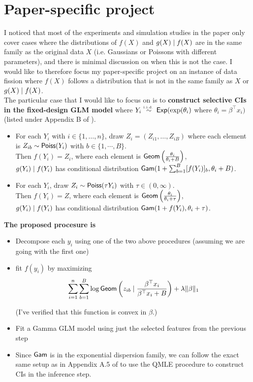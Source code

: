 \section{Paper-specific project}
I noticed that most of the experiments and simulation studies in the paper only cover cases where the distributions of $f(X)$ and $g(X)\mid f(X)$ are in the same family as the original data $X$ (i.e. Gaussians or Poissons with different parameters), and there is minimal discussion on when this is not the case. I would like to therefore focus my paper-specific project on an instance of data fission where $f(X)$ follows a distribution that is not in the same family as $X$ or $g(X)\mid f(X)$.\\

The particular case that I would like to focus on is to \textbf{construct selective CIs in the fixed-design GLM model} where $Y_i \overset{\textrm{\tiny i.i.d.\ }}{\sim} {\sf{Exp}}(\exp(\theta_i)$ where $\theta_i=\beta^\top x_i)$ (listed under Appendix B of \cite{leiner2022data}).

\begin{itemize}
\item For each $Y_i$ with $i\in\{1,\dots,n\}$, draw $Z_i=(Z_{i1}, \dots, Z_{iB})$ where each element is \iid $Z_{ib} \sim {\sf{Poiss}}(Y_i)$ with $b\in\{1,\cdots,B\}$.\\
Then $f(Y_i) = Z_i$, where each element is \iid ${\sf{Geom}}\left(\frac{\theta_i}{\theta_i+B}\right)$,\\
$g(Y_i) \mid f(Y_i)$ has conditional distribution ${\sf{Gam}}(1+\sum_{b=1}^B [f(Y_i)]_b, \theta_i + B)$.

\item For each $Y_i$, draw $Z_i \sim {\sf{Poiss}}(\tau Y_i)$ with $\tau\in(0,\infty)$.\\
Then $f(Y_i) = Z$, where each element is \iid ${\sf{Geom}}\left(\frac{\theta_i}{\theta_i+\tau}\right)$,\\
$g(Y_i) \mid f(Y_i)$ has conditional distribution ${\sf{Gam}}(1+f(Y_i), \theta_i + \tau)$.
\end{itemize}

\textbf{The proposed procesure is}

\begin{itemize}
\item Decompose each $y_i$ using one of the two above procedures (assuming we are going with the first one)

\item fit $f(y_i)$ by maximizing
\[
\sum_{i=1}^n\sum_{b=1}^B \log {\sf{Geom}}\left(z_{ib} \mid \frac{\beta^\top x_i}{\beta^\top x_i+B}\right) + \lambda \|\beta\|_1
\]

(I've verified that this function is convex in $\beta$.)

\item Fit a Gamma GLM model using just the selected features from the previous step

\item Since ${\sf{Gam}}$ is in the exponential dispersion family, we can follow the exact same setup as in Appendix A.5 of \cite{leiner2022data} to use the QMLE procedure to construct CIs in the inference step.

\end{itemize}

